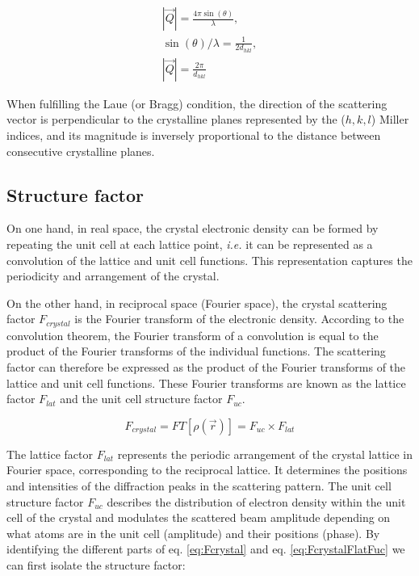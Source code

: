 \begin{gather}
    \label{eq:QandD}
    |\vec{Q}| = \frac{4\pi \sin(\theta)}{\lambda},\\
    \sin(\theta) / \lambda = \frac{1}{2d_{hkl}},\\
    |\vec{Q}| = \frac{2\pi}{d_{hkl}}
\end{gather}{}

When fulfilling the Laue (or Bragg) condition, the direction of the scattering vector is perpendicular to the crystalline planes represented by the ($h, k, l$) Miller indices, and its magnitude is inversely proportional to the distance between consecutive crystalline planes.

\subsection{Structure factor} \label{sec:StructureFactor}

On one hand, in real space, the crystal electronic density can be formed by repeating the unit cell at each lattice point, \textit{i.e.} it can be represented as a convolution of the lattice and unit cell functions.
This representation captures the periodicity and arrangement of the crystal.

On the other hand, in reciprocal space (Fourier space), the crystal scattering factor $F_{crystal}$ is the Fourier transform of the electronic density.
According to the convolution theorem, the Fourier transform of a convolution is equal to the product of the Fourier transforms of the individual functions.
The scattering factor can therefore be expressed as the product of the Fourier transforms of the lattice and unit cell functions.
These Fourier transforms are known as the lattice factor $F_{lat}$ and the unit cell structure factor $F_{uc}$.

\begin{equation}
    F_{crystal} = FT[\rho(\vec{r})] = F_{uc} \times F_{lat}
    \label{eq:FcrystalFlatFuc}
\end{equation}

The lattice factor $F_{lat}$ represents the periodic arrangement of the crystal lattice in Fourier space, corresponding to the reciprocal lattice.
It determines the positions and intensities of the diffraction peaks in the scattering pattern.
The unit cell structure factor $F_{uc}$ describes the distribution of electron density within the unit cell of the crystal and modulates the scattered beam amplitude depending on what atoms are in the unit cell (amplitude) and their positions (phase).
By identifying the different parts of eq. \ref{eq:Fcrystal} and eq. \ref{eq:FcrystalFlatFuc} we can first isolate the structure factor:

